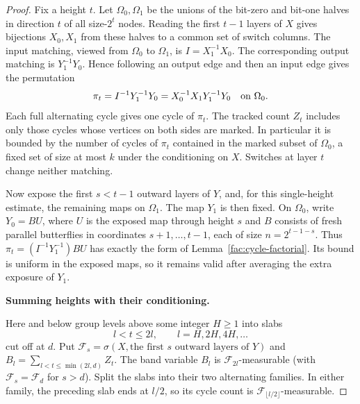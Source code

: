 \begin{proof}
Fix a height $t$. Let $\Omega_0,\Omega_1$ be the unions of the bit-zero
and bit-one halves in direction $t$ of all size-$2^t$ nodes. Reading the
first $t-1$ layers of $X$ gives bijections $X_0,X_1$ from these halves to
a common set of switch columns. The input matching, viewed from
$\Omega_0$ to $\Omega_1$, is $I=X_1^{-1}X_0$. The corresponding output
matching is $Y_1^{-1}Y_0$. Hence following an output edge and then an input
edge gives the permutation
\begin{equation}\label{fac:relative-permutation}
 \pi_t=I^{-1}Y_1^{-1}Y_0
       =X_0^{-1}X_1Y_1^{-1}Y_0
       \quad\hbox{on }\Omega_0.
\end{equation}
Each full alternating cycle gives one cycle of $\pi_t$.
The tracked count $Z_t$ includes only those cycles whose vertices on both
sides are marked. In particular it is bounded by the number of cycles of
$\pi_t$ contained in the marked subset of $\Omega_0$, a fixed set of
size at most $k$ under the conditioning on $X$. Switches at layer $t$
change neither matching.

Now expose the first $s<t-1$ outward layers of $Y$, and, for this
single-height estimate, the remaining maps on $\Omega_1$. The map $Y_1$
is then fixed. On $\Omega_0$, write $Y_0=B U$, where $U$ is the exposed
map through height $s$ and $B$ consists of fresh parallel butterflies in
coordinates $s+1,\ldots,t-1$, each of size $n=2^{t-1-s}$. Thus
$\pi_t=(I^{-1}Y_1^{-1})B U$ has exactly the form of
Lemma~\ref{fac:cycle-factorial}. Its bound is uniform in the exposed
maps, so it remains valid after averaging the extra exposure of $Y_1$.

\medskip\noindent\textbf{Summing heights with their conditioning.}\enspace

Here and below group levels above some integer $H\ge1$ into slabs
\[
l<t\le 2l,\qquad l=H,2H,4H,\ldots
\]
cut off at $d$. Put $\mathcal F_s=\sigma(X,\text{the first $s$ outward layers of }Y)$ and
$B_l=\sum_{l<t\le\min(2l,d)}Z_t$. The band variable $B_l$ is
$\mathcal F_{2l}$-measurable (with $\mathcal F_s=\mathcal F_d$ for $s>d$).
Split the slabs into their two alternating families. In either family,
the preceding slab ends at $l/2$, so its cycle count is
$\mathcal F_{\lfloor l/2\rfloor}$-measurable.


\end{proof}

